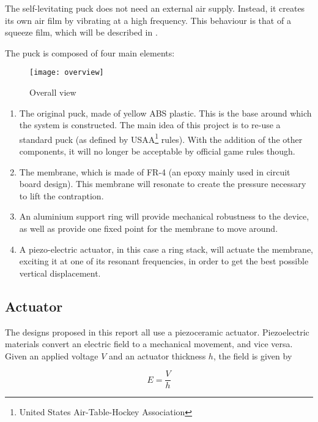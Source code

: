 The self-levitating puck does not need an external air supply. Instead, it
creates its own air film by vibrating at a high frequency. This behaviour is
that of a squeeze film, which will be described in .

The puck is composed of four main elements:

\begin{figure}[h]
  \begin{center}
    \texttt{[image: overview]}
  \end{center}
  \caption{Overall view}
  \label{fig:overview}
\end{figure}

\begin{enumerate}[A]
  \item The original puck, made of yellow ABS plastic. This is the base around
    which the system is constructed. The main idea of this project is to re-use a
    standard puck (as defined by USAA\footnote{United States Air-Table-Hockey
    Association} rules). With the addition of the other
    components, it will no longer be acceptable by official game rules though.
  \item The membrane, which is made of FR-4 (an epoxy mainly used in circuit
    board design). This membrane will resonate to create the pressure necessary
    to lift the contraption.
  \item An aluminium support ring will provide mechanical robustness to the
    device, as well as provide one fixed point for the membrane to move around.
  \item A piezo-electric actuator, in this case a ring stack, will actuate
    the membrane, exciting it at one of its resonant frequencies, in order to
    get the best possible vertical displacement.
\end{enumerate}

\subsection{Actuator}

The designs proposed in this report all use a piezoceramic actuator.
Piezoelectric materials convert an electric field to a mechanical movement, and
vice versa. Given an applied voltage $V$ and an actuator thickness $h$, the
field is given by

\begin{equation}
  E = \frac{V}{h}
  \label{eq:field}
\end{equation}


